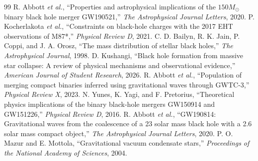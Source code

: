 \documentclass[conference]{IEEEtran}
\newcommand{\Msun}{M_{\odot}}
\begin{document}
\begin{thebibliography}{99}
 R. Abbott \emph{et al.}, ``Properties and astrophysical implications of the $150\Msun$ binary black hole merger GW190521,'' \emph{The Astrophysical Journal Letters}, 2020.
 P. Kocherlakota \emph{et al.}, ``Constraints on black-hole charges with the 2017 EHT observations of M87*,'' \emph{Physical Review D}, 2021.
 C. D. Bailyn, R. K. Jain, P. Coppi, and J. A. Orosz, ``The mass distribution of stellar black holes,'' \emph{The Astrophysical Journal}, 1998.
 D. Kushangi, ``Black hole formation from massive star collapse: A review of physical mechanisms and observational evidence,'' \emph{American Journal of Student Research}, 2026.
 R. Abbott \emph{et al.}, ``Population of merging compact binaries inferred using gravitational waves through GWTC-3,'' \emph{Physical Review X}, 2023.
 N. Yunes, K. Yagi, and F. Pretorius, ``Theoretical physics implications of the binary black-hole mergers GW150914 and GW151226,'' \emph{Physical Review D}, 2016.
 R. Abbott \emph{et al.}, ``GW190814: Gravitational waves from the coalescence of a 23 solar mass black hole with a 2.6 solar mass compact object,'' \emph{The Astrophysical Journal Letters}, 2020.
 P. O. Mazur and E. Mottola, ``Gravitational vacuum condensate stars,'' \emph{Proceedings of the National Academy of Sciences}, 2004.
\end{thebibliography}
\end{document}
